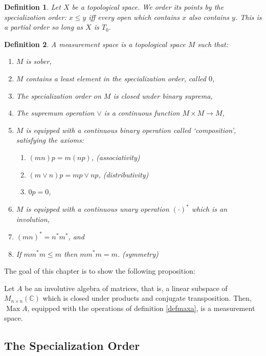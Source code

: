 \documentclass{article}
\theoremstyle{plain}
\newtheorem{definition}{Definition}
\theoremstyle{nonumberplain}
\DeclareMathOperator{\Max}{Max}
\newcommand{\C}{\mathbb{C}}
\begin{document}
\begin{definition}
Let $X$ be a topological space. We order its points by the specialization order: $x \leq y$ iff every open which contains $x$ also contains $y$. This is a partial order so long as $X$ is $T_0$.
\end{definition}

\begin{definition}
A measurement space is a topological space $M$ such that:
\begin{enumerate}[label=\roman*)]
\item \label{msober} $M$ is sober,
\item \label{leastelem} $M$ contains a least element in the specialization order, called $0$,
\item \label{binsup} The specialization order on $M$ is closed under binary suprema,
\item \label{contsup} The supremum operation $\lor$ is a continuous function $M \times M \to M$,
\item \label{binop} $M$ is equipped with a continuous binary operation called `composition', satisfying the axioms:
\begin{enumerate}
\item \label{assoc} $(mn)p = m(np)$, \quad \textit{(associativity)}
\item \label{dist} $(m \lor n)p = mp \lor np$, \quad \textit{(distributivity)}
\item \label{absorp} $0p = 0$,
\end{enumerate}
\item \label{inv1} $M$ is equipped with a continuous unary operation $(\cdot)^*$ which is an involution,
\item \label{inv2} $(mn)^* = n^* m^*$, and
\item \label{symmetry} If $m m^* m \leq m$ then $m m^* m = m$. \quad \textit{(symmetry)}
\end{enumerate}
\end{definition}

The goal of this chapter is to show the following proposition:

\begin{prop*}
Let $A$ be an involutive algebra of matrices, that is, a linear subspace of $M_{n \times n}(\C)$ which is closed under products and conjugate transposition. Then, $\Max A$, equipped with the operations of definition \ref{defmaxa}, is a measurement space.
\end{prop*}

\subsection{The Specialization Order}
\end{document}
